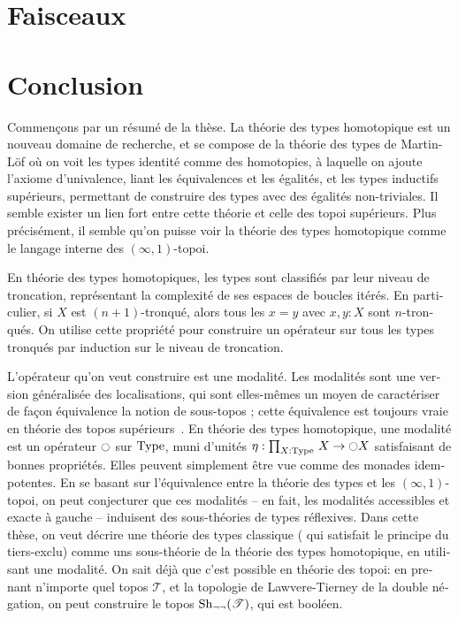 \begin{otherlanguage}{french}

\section{Faisceaux}


\section{Conclusion}
Commençons par un résumé de la thèse. La théorie des types homotopique
est un nouveau domaine de recherche, et se compose de la théorie des
types de Martin-Löf où on voit les types identité comme des
homotopies, à laquelle on ajoute l'axiome d'univalence, liant les
équivalences et les égalités, et les types inductifs supérieurs,
permettant de construire des types avec des égalités non-triviales.
Il semble exister un lien fort entre cette théorie et celle des topoi
supérieurs. Plus précisément, il semble qu'on puisse voir la théorie
des types homotopique comme le langage interne des $(\infty,1)$-topoi.

En théorie des types homotopiques, les types sont classifiés par leur
niveau de troncation, représentant la complexité de ses espaces de
boucles itérés. En particulier, si $X$ est $(n+1)$-tronqué, alors tous
les $x=y$ avec $x,y:X$ sont $n$-tronqués. On utilise cette propriété
pour construire un opérateur sur tous les types tronqués par induction
sur le niveau de troncation.

L'opérateur qu'on veut construire est une modalité. Les modalités sont
une version généralisée des localisations, qui sont elles-mêmes un
moyen de caractériser de façon équivalence la notion de sous-topos ;
cette équivalence est toujours vraie en théorie des topos
supérieurs~\cite[Section 6.2.2]{lurie}. En théorie des types
homotopique, une modalité est un opérateur $\ocircle$ sur $\operatorname{Type}$, muni
d'unités $\eta:\prod_{X:\operatorname{Type}}\, X\to\ocircle X$ satisfaisant de bonnes
propriétés. Elles peuvent simplement être vue comme des monades
idempotentes. En se basant sur l'équivalence entre la théorie des
types et les $(\infty,1)$-topoi, on peut conjecturer que ces modalités
-- en fait, les modalités accessibles et exacte à gauche -- induisent
des sous-théories de types réflexives. Dans cette thèse, on veut
décrire une théorie des types classique (\ie{} qui satisfait le
principe du tiers-exclu) comme uns sous-théorie de la théorie des
types homotopique, en utilisant une modalité. On sait déjà que c'est
possible en théorie des topoi: en prenant n'importe quel topos
$\mathcal T$, et la topologie de Lawvere-Tierney de la double
négation, on peut construire le topos $\mathrm{Sh}_{\lnot\lnot}(\mathcal T)$,
qui est booléen.


\end{otherlanguage}
